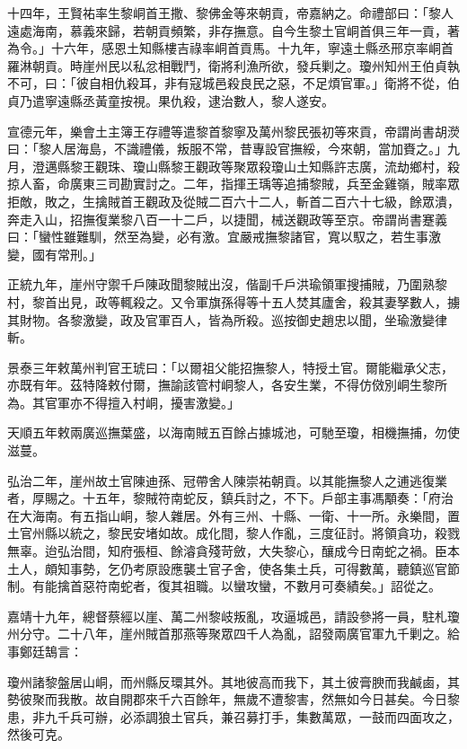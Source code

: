\begin{pinyinscope}
十四年，王賢祐率生黎峒首王撒、黎佛金等來朝貢，帝嘉納之。命禮部曰：「黎人遠處海南，慕義來歸，若朝貢頻繁，非存撫意。自今生黎土官峒首俱三年一貢，著為令。」十六年，感恩土知縣樓吉祿率峒首貢馬。十九年，寧遠土縣丞邢京率峒首羅淋朝貢。時崖州民以私忿相戰鬥，衛將利漁所欲，發兵剿之。瓊州知州王伯貞執不可，曰：「彼自相仇殺耳，非有寇城邑殺良民之惡，不足煩官軍。」衛將不從，伯貞乃遣寧遠縣丞黃童按視。果仇殺，逮治數人，黎人遂安。

宣德元年，樂會土主簿王存禮等遣黎首黎寧及萬州黎民張初等來貢，帝謂尚書胡濙曰：「黎人居海島，不識禮儀，叛服不常，昔專設官撫綏，今來朝，當加賚之。」九月，澄邁縣黎王觀珠、瓊山縣黎王觀政等聚眾殺瓊山土知縣許志廣，流劫鄉村，殺掠人畜，命廣東三司勘實討之。二年，指揮王瑀等追捕黎賊，兵至金雞嶺，賊率眾拒敵，敗之，生擒賊首王觀政及從賊二百六十二人，斬首二百六十七級，餘眾潰，奔走入山，招撫復業黎八百一十二戶，以捷聞，械送觀政等至京。帝謂尚書蹇義曰：「蠻性雖難馴，然至為變，必有激。宜嚴戒撫黎諸官，寬以馭之，若生事激變，國有常刑。」

正統九年，崖州守禦千戶陳政聞黎賊出沒，偕副千戶洪瑜領軍搜捕賊，乃圍熟黎村，黎首出見，政等輒殺之。又令軍旗孫得等十五人焚其廬舍，殺其妻孥數人，擄其財物。各黎激變，政及官軍百人，皆為所殺。巡按御史趙忠以聞，坐瑜激變律斬。

景泰三年敕萬州判官王琥曰：「以爾祖父能招撫黎人，特授土官。爾能繼承父志，亦既有年。茲特降敕付爾，撫諭該管村峒黎人，各安生業，不得仿傚別峒生黎所為。其官軍亦不得擅入村峒，擾害激變。」

天順五年敕兩廣巡撫葉盛，以海南賊五百餘占據城池，可馳至瓊，相機撫捕，勿使滋蔓。

弘治二年，崖州故土官陳迪孫、冠帶舍人陳崇祐朝貢。以其能撫黎人之逋逃復業者，厚賜之。十五年，黎賊符南蛇反，鎮兵討之，不下。戶部主事馮顒奏：「府治在大海南。有五指山峒，黎人雜居。外有三州、十縣、一衛、十一所。永樂間，置土官州縣以統之，黎民安堵如故。成化間，黎人作亂，三度征討。將領貪功，殺戮無辜。迨弘治間，知府張桓、餘濬貪殘苛斂，大失黎心，釀成今日南蛇之禍。臣本土人，頗知事勢，乞仍考原設應襲土官子舍，使各集土兵，可得數萬，聽鎮巡官節制。有能擒首惡符南蛇者，復其祖職。以蠻攻蠻，不數月可奏績矣。」詔從之。

嘉靖十九年，總督蔡經以崖、萬二州黎岐叛亂，攻逼城邑，請設參將一員，駐札瓊州分守。二十八年，崖州賊首那燕等聚眾四千人為亂，詔發兩廣官軍九千剿之。給事鄭廷鵠言：

瓊州諸黎盤居山峒，而州縣反環其外。其地彼高而我下，其土彼膏腴而我鹹鹵，其勢彼聚而我散。故自開郡來千六百餘年，無歲不遭黎害，然無如今日甚矣。今日黎患，非九千兵可辦，必添調狼土官兵，兼召募打手，集數萬眾，一鼓而四面攻之，然後可克。


\end{pinyinscope}
